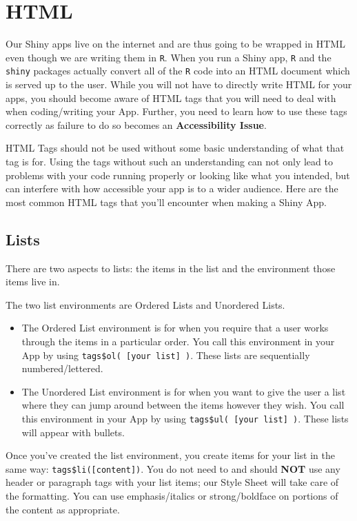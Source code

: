 \documentclass[
]{book}
\providecommand{\tightlist}{%
  \setlength{\itemsep}{0pt}\setlength{\parskip}{0pt}}
\begin{document}
\hypertarget{htmlc}{%
\section{HTML}\label{htmlc}}

Our Shiny apps live on the internet and are thus going to be wrapped in HTML even though we are writing them in \texttt{R}. When you run a Shiny app, \texttt{R} and the \texttt{shiny} packages actually convert all of the \texttt{R} code into an HTML document which is served up to the user. While you will not have to directly write HTML for your apps, you should become aware of HTML tags that you will need to deal with when coding/writing your App. Further, you need to learn how to use these tags correctly as failure to do so becomes an \textbf{Accessibility Issue}.

HTML Tags should not be used without some basic understanding of what that tag is for. Using the tags without such an understanding can not only lead to problems with your code running properly or looking like what you intended, but can interfere with how accessible your app is to a wider audience. Here are the most common HTML tags that you'll encounter when making a Shiny App.

\hypertarget{lists-2}{%
\subsection{Lists}\label{lists-2}}

There are two aspects to lists: the items in the list and the environment those items live in.

The two list environments are Ordered Lists and Unordered Lists.

\begin{itemize}
\tightlist
\item
  The Ordered List environment is for when you require that a user works through the items in a particular order. You call this environment in your App by using \texttt{tags\$ol(\ {[}your\ list{]}\ )}. These lists are sequentially numbered/lettered.
\item
  The Unordered List environment is for when you want to give the user a list where they can jump around between the items however they wish. You call this environment in your App by using \texttt{tags\$ul(\ {[}your\ list{]}\ )}. These lists will appear with bullets.
\end{itemize}

Once you've created the list environment, you create items for your list in the same way: \texttt{tags\$li({[}content{]})}. You do not need to and should \textbf{NOT} use any header or paragraph tags with your list items; our Style Sheet will take care of the formatting. You can use emphasis/italics or strong/boldface on portions of the content as appropriate.
\end{document}
